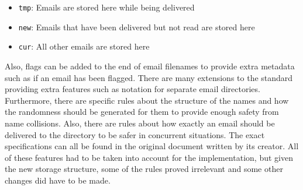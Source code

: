 \begin{itemize}
\item \texttt{tmp}: Emails are stored here while being delivered
\item \texttt{new}: Emails that have been delivered but not read are stored here
\item \texttt{cur}: All other emails are stored here
\end{itemize}

Also, flags can be added to the end of email filenames to provide extra metadata such as if an email has been flagged. There are many extensions to the standard providing extra features such as notation for separate email directories. Furthermore, there are specific rules about the structure of the names and how the randomness should be generated for them to provide enough safety from name collisions. Also, there are rules about how exactly an email should be delivered to the directory to be safer in concurrent situations. The exact specifications can all be found in the original document written by its creator\cite{bernstein2000maildir}. All of these features had to be taken into account for the implementation, but given the new storage structure, some of the rules proved irrelevant and some other changes did have to be made.
